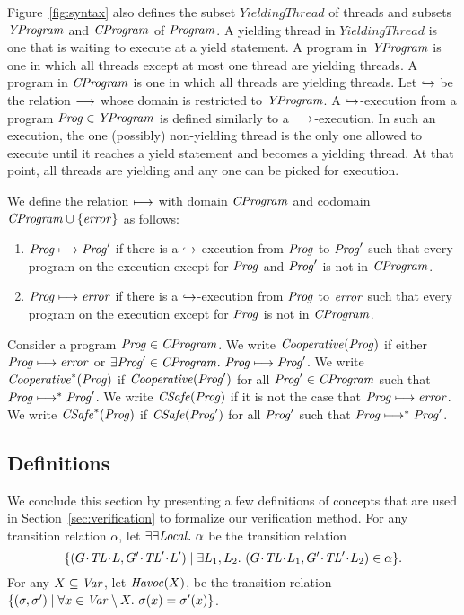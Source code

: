 Figure~\ref{fig:syntax} also defines the subset $\mathit{YieldingThread}$ of threads and subsets 
$\mathit{YProgram}$ and $\mathit{CProgram}$ of $\mathit{Program}$.
A yielding thread in $\mathit{YieldingThread}$ is one that is waiting to execute at a yield statement.
A program in $\mathit{YProgram}$ is one in which all threads except at most one thread are yielding threads.
A program in $\mathit{CProgram}$ is one in which all threads are yielding threads.
Let $\hookrightarrow$ be the relation $\longrightarrow$ whose domain is restricted to $\mathit{YProgram}$.
A $\hookrightarrow$-execution from a program $\mathit{Prog} \in \mathit{YProgram}$ is defined similarly to a $\longrightarrow$-execution.
In such an execution, the one (possibly) non-yielding thread is the only one allowed to execute until it reaches 
a yield statement and becomes a yielding thread.
At that point, all threads are yielding and any one can be picked for execution.

We define the relation $\longmapsto$ with domain $\mathit{CProgram}$ and codomain $\mathit{CProgram} \cup \{\mathit{error}\}$ as follows:
\begin{enumerate}
\item 
$\mathit{Prog} \longmapsto \mathit{Prog}'$ if there is a $\hookrightarrow$-execution from $\mathit{Prog}$ to $\mathit{Prog}'$ such that every program on the execution 
except for $\mathit{Prog}$ and $\mathit{Prog}'$ is not in $\mathit{CProgram}$.
\item
$\mathit{Prog} \longmapsto \mathit{error}$ if there is a $\hookrightarrow$-execution from $\mathit{Prog}$ to $\mathit{error}$ such that every program on the execution 
except for $\mathit{Prog}$ is not in $\mathit{CProgram}$.
\end{enumerate}

Consider a program $\mathit{Prog} \in \mathit{CProgram}$.
We write $\mathit{Cooperative}(\mathit{Prog})$ if either $\mathit{Prog} \longmapsto \mathit{error}$ or $\exists \mathit{Prog}' \in \mathit{CProgram}.\ \mathit{Prog} \longmapsto \mathit{Prog}'$.
We write $\mathit{Cooperative}^*(\mathit{Prog})$ if $\mathit{Cooperative}(\mathit{Prog}')$ for all $\mathit{Prog}' \in \mathit{CProgram}$ such that $\mathit{Prog} \longmapsto^* \mathit{Prog}'$.
We write $\mathit{CSafe}(\mathit{Prog})$ if it is not the case that $\mathit{Prog} \longmapsto \mathit{error}$.
We write $\mathit{CSafe}^*(\mathit{Prog})$ if $\mathit{CSafe}(\mathit{Prog}')$ for all $\mathit{Prog}'$ such that $\mathit{Prog} \longmapsto^* \mathit{Prog}'$.

\subsection{Definitions}
\label{sec:definitions}
We conclude this section by presenting a few definitions of concepts that are used in Section~\ref{sec:verification} to formalize
our verification method.
For any transition relation $\alpha$, let $\exists\exists {\mathit{Local}}.\ \alpha$ be the transition relation
\[\{(\MakeStore{\varsG}{\varsTL}{\varsL}, \MakeStore{\varsG'}{\varsTL'}{\varsL'}) \mid \exists \varsL_1,\varsL_2.\ (\MakeStore{\varsG}{\varsTL}{\varsL_1}, \MakeStore{\varsG'}{\varsTL'}{\varsL_2}) \in \alpha \}.\]
For any $X \subseteq \mathit{Var}$, let $\mathit{Havoc}(X)$, be the transition relation 
$\{(\sigma,\sigma') \mid \forall x \in \mathit{Var} \setminus X.\ \sigma(x) = \sigma'(x)\}$.

